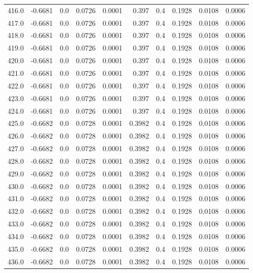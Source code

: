 \begin{longtable}{lrrrrrrrrr}
416.0 & -0.6681 & 0.0 & 0.0726 & 0.0001 & 0.397 & 0.4 & 0.1928 & 0.0108 & 0.0006 \\
417.0 & -0.6681 & 0.0 & 0.0726 & 0.0001 & 0.397 & 0.4 & 0.1928 & 0.0108 & 0.0006 \\
418.0 & -0.6681 & 0.0 & 0.0726 & 0.0001 & 0.397 & 0.4 & 0.1928 & 0.0108 & 0.0006 \\
419.0 & -0.6681 & 0.0 & 0.0726 & 0.0001 & 0.397 & 0.4 & 0.1928 & 0.0108 & 0.0006 \\
420.0 & -0.6681 & 0.0 & 0.0726 & 0.0001 & 0.397 & 0.4 & 0.1928 & 0.0108 & 0.0006 \\
421.0 & -0.6681 & 0.0 & 0.0726 & 0.0001 & 0.397 & 0.4 & 0.1928 & 0.0108 & 0.0006 \\
422.0 & -0.6681 & 0.0 & 0.0726 & 0.0001 & 0.397 & 0.4 & 0.1928 & 0.0108 & 0.0006 \\
423.0 & -0.6681 & 0.0 & 0.0726 & 0.0001 & 0.397 & 0.4 & 0.1928 & 0.0108 & 0.0006 \\
424.0 & -0.6681 & 0.0 & 0.0726 & 0.0001 & 0.397 & 0.4 & 0.1928 & 0.0108 & 0.0006 \\
425.0 & -0.6682 & 0.0 & 0.0728 & 0.0001 & 0.3982 & 0.4 & 0.1928 & 0.0108 & 0.0006 \\
426.0 & -0.6682 & 0.0 & 0.0728 & 0.0001 & 0.3982 & 0.4 & 0.1928 & 0.0108 & 0.0006 \\
427.0 & -0.6682 & 0.0 & 0.0728 & 0.0001 & 0.3982 & 0.4 & 0.1928 & 0.0108 & 0.0006 \\
428.0 & -0.6682 & 0.0 & 0.0728 & 0.0001 & 0.3982 & 0.4 & 0.1928 & 0.0108 & 0.0006 \\
429.0 & -0.6682 & 0.0 & 0.0728 & 0.0001 & 0.3982 & 0.4 & 0.1928 & 0.0108 & 0.0006 \\
430.0 & -0.6682 & 0.0 & 0.0728 & 0.0001 & 0.3982 & 0.4 & 0.1928 & 0.0108 & 0.0006 \\
431.0 & -0.6682 & 0.0 & 0.0728 & 0.0001 & 0.3982 & 0.4 & 0.1928 & 0.0108 & 0.0006 \\
432.0 & -0.6682 & 0.0 & 0.0728 & 0.0001 & 0.3982 & 0.4 & 0.1928 & 0.0108 & 0.0006 \\
433.0 & -0.6682 & 0.0 & 0.0728 & 0.0001 & 0.3982 & 0.4 & 0.1928 & 0.0108 & 0.0006 \\
434.0 & -0.6682 & 0.0 & 0.0728 & 0.0001 & 0.3982 & 0.4 & 0.1928 & 0.0108 & 0.0006 \\
435.0 & -0.6682 & 0.0 & 0.0728 & 0.0001 & 0.3982 & 0.4 & 0.1928 & 0.0108 & 0.0006 \\
436.0 & -0.6682 & 0.0 & 0.0728 & 0.0001 & 0.3982 & 0.4 & 0.1928 & 0.0108 & 0.0006 \\

\end{longtable}
